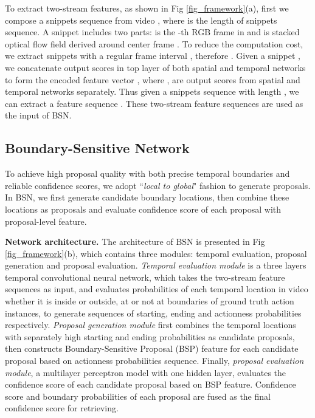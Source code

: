 \documentclass[runningheads]{llncs}
\begin{document}
To extract two-stream features, as shown in Fig \ref{fig_framework}(a), first we compose a snippets sequence  from video , where  is the length of snippets sequence.  A snippet  includes two parts:  is the -th RGB frame in  and  is stacked optical flow field derived around center frame . 
To reduce the computation cost, we extract snippets with a regular frame interval , therefore  .
Given a snippet , we concatenate output scores in top layer of both spatial and temporal networks to form the encoded feature vector , where ,  are output scores from spatial and temporal networks separately.  
Thus given a snippets sequence  with length , we can extract a feature sequence . These two-stream feature sequences are used as the input of BSN.



\subsection{Boundary-Sensitive Network}

To achieve high proposal quality with both precise temporal boundaries and reliable confidence scores, we adopt ``\emph{local to global}" fashion to generate proposals. In BSN, we first generate candidate boundary locations, then combine these locations as proposals and evaluate confidence score of each proposal with proposal-level feature.   


\noindent
{\bf Network architecture.}
The architecture of BSN is presented in Fig \ref{fig_framework}(b), which contains three modules: temporal evaluation, proposal generation  and proposal evaluation. 
\emph{Temporal evaluation module} is a three layers temporal convolutional neural network, which  takes the two-stream feature sequences as input, and evaluates probabilities of each temporal location in video whether it is inside or outside, at or not at boundaries of ground truth action instances, to generate sequences of starting, ending and actionness probabilities respectively. \emph{Proposal generation module} first combines the temporal locations with separately high starting and ending probabilities as candidate proposals, then constructs Boundary-Sensitive Proposal (BSP) feature for each candidate proposal based on  actionness probabilities sequence. 
Finally, \emph{proposal evaluation module}, a multilayer perceptron model with one hidden layer, evaluates the confidence score of each candidate proposal based on BSP feature.
Confidence score and boundary probabilities of each proposal are fused as the final confidence score for retrieving. 
\end{document}
